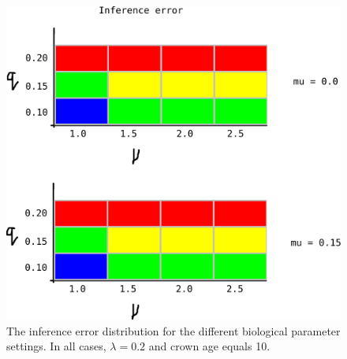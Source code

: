 \begin{figure}[!htbp]
  \includegraphics[width=\textwidth]{razzo-figures/fig_1.png}
  \caption{
    The inference error distribution for the different biological
    parameter settings. In all cases, $\lambda = 0.2$ and 
    crown age equals 10.
  }
  \label{fig:results}
\end{figure}